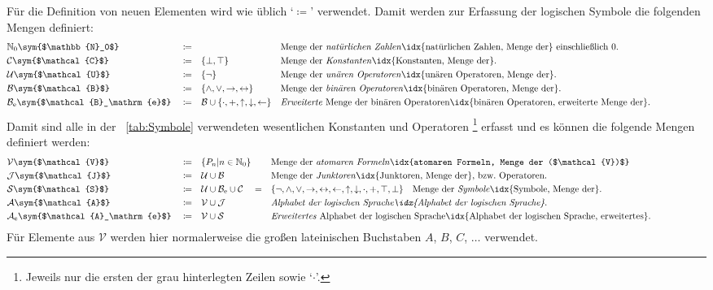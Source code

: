 \documentclass[english,ngerman,parskip=half,headsepline,footsepline,
	fleqn,notitlepage]{scrreprt}
\makeatletter
\newcommand*{\defeq}{\coloneqq}%
\newcommand*{\ladd}{+}
\newcommand*{\lmult}{\cdot}
\newcommand*{\ltrue}{\top}%
\newcommand*{\lfalse}{\bot}%
\newcommand*{\lrep}{\leftarrow}%
\newcommand*{\limp}{\rightarrow}%
\newcommand*{\lequiv}{\leftrightarrow}%
\newcommand*{\lnand}{\uparrow}%
\newcommand*{\lnor}{\downarrow}%
\newcommand*{\ase}{_\mathrm{e}}%
\newcommand*{\asN}{\mathbb{N}_0}%
\newcommand*{\asA}{\mathcal{A}}%
\newcommand*{\asB}{\mathcal{B}}%
\newcommand*{\asC}{\mathcal{C}}%
\newcommand*{\asJ}{\mathcal{J}}%
\newcommand*{\asS}{\mathcal{S}}%
\newcommand*{\asU}{\mathcal{U}}%
\newcommand*{\asV}{\mathcal{V}}%
\newcommand*{\asAe}{\asA\ase}%
\newcommand*{\asBe}{\asB\ase}%
\newcommand*{\formulatoleft}{&&&&&&&&&&}%
\newcommand*{\charqt}[1]{\enquote*{#1}}%
\newcommand*{\symqt}[1]{\charqt{#1}}%
\newcommand*{\textbzw}{bzw.\@ }
\newcommand*{\Sym}[1]{#1\sym{$#1$}}%
\makeatother
\begin{document}
	Für die Definition von neuen Elementen
	wird wie üblich \symqt{$\defeq$} verwendet.
	Damit werden zur Erfassung der logischen Symbole
	die folgenden Mengen definiert:
	\begin{align}
		& \Sym{\asN}  & & \defeq & &
		& & \textrm{Menge der \emph{natürlichen Zahlen}%
		\idx{natürlichen Zahlen, Menge der} einschließlich 0.} \label{def:N} \\
		& \Sym{\asC}  & & \defeq & & \{ \lfalse, \ltrue \}
		& & \textrm{Menge der \emph{Konstanten}%
		\idx{Konstanten, Menge der}.}                          \label{def:C} \\
		& \Sym{\asU}  & & \defeq & & \{ \lnot \}
		& & \textrm{Menge der \emph{unären Operatoren}%
		\idx{unären Operatoren, Menge der}.}                   \label{def:U} \\
		& \Sym{\asB}  & & \defeq & & \{ \land, \lor, \limp, \lequiv \}
		& & \textrm{Menge der \emph{binären Operatoren}%
		\idx{binären Operatoren, Menge der}.}                  \label{def:B} \\
		& \Sym{\asBe} & & \defeq & & \asB\cup\{\lmult,\ladd,\lnand,\lnor,\lrep\}
		& & \textrm{\emph{Erweiterte} Menge der binären Operatoren%
		\idx{binären Operatoren, erweiterte Menge der}.}       \label{def:Be}
		\formulatoleft
	\end{align}
	Damit sind alle in der \tablename~\vref{tab:Symbole} verwendeten
	wesentlichen Konstanten und Operatoren%
	\footnote{%
		Jeweils nur die ersten der grau hinterlegten Zeilen sowie \symqt{$\lmult$}.%
	}
	erfasst und es können die folgende Mengen definiert werden:
	\begin{align}
		& \Sym{\asV}  & & \defeq & & \{ P_n | n \in \asN \}
		& & \textrm{Menge der \emph{atomaren Formeln}%
		\idx{atomaren Formeln, Menge der ($\asV)$}}         \label{def:V} \\
		& \Sym{\asJ}  & & \defeq & & \asU \cup \asB
		& & \textrm{Menge der \emph{Junktoren}%
		\idx{Junktoren, Menge der}, \textbzw Operatoren.}   \label{def:J} \\
		& \Sym{\asS}  & & \defeq & & \asU \cup \asBe\cup\asC \quad =
		& & \{ \lnot, \land, \lor, \limp, \lequiv, \lrep, \lnand, \lnor, \lmult,
		\ladd, \ltrue, \lfalse \} \quad \textrm{Menge der \emph{Symbole}%
		\idx{Symbole, Menge der}.}                          \label{def:S} \\
		& \Sym{\asA}  & & \defeq & & \asV \cup \asJ
		& & \textrm{\emph{Alphabet der logischen Sprache%
		\idx{Alphabet der logischen Sprache}}.}             \label{def:A} \\
		& \Sym{\asAe} & & \defeq & & \asV \cup \asS
		& & \textrm{\emph{Erweitertes} Alphabet der logischen Sprache%
		\idx{Alphabet der logischen Sprache, erweitertes}.} \label{def:Ae}
		\formulatoleft
	\end{align}
	Für Elemente aus $\asV$ werden hier normalerweise
	die großen lateinischen Buchstaben $A$, $B$, $C$, $\dots$ verwendet.
\end{document}
